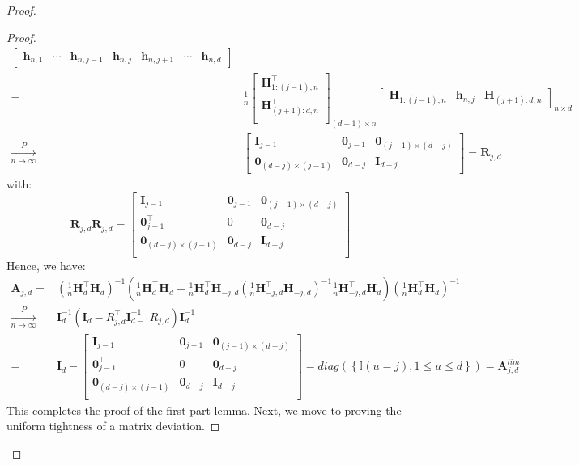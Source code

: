\documentclass[
  12pt]{article}
\newcommand{\pnlim}{\xrightarrow[n \to \infty]{P}}
\newcommand{\bR}{\boldsymbol{R}}
\newcommand{\bh}{\boldsymbol{h}}
\newcommand{\bA}{\boldsymbol{A}}
\newcommand{\bI}{\boldsymbol{I}}
\newcommand{\bH}{\boldsymbol{H}}
\newcommand{\bzero}{\boldsymbol{0}}
\begin{document}
\begin{proof}
\begin{proof}
\begin{equation}
\begin{split}
\begin{bmatrix}
    \bh_{n,1} & \cdots & \bh_{n,j-1}&\bh_{n,j}&\bh_{n,j+1}& \cdots& \bh_{n,d}
\end{bmatrix}\\
= & \frac{1}{n}\begin{bmatrix}
    \bH^\top_{1:(j-1),n}\\
     \bH^\top_{(j+1):d,n}\\
\end{bmatrix}_{(d-1)\times n}\begin{bmatrix}
    \bH_{1:(j-1),n} & \bh_{n,j} & \bH_{(j+1):d,n}
\end{bmatrix}_{n \times d}\\
\pnlim & \begin{bmatrix}
    \bI_{j-1} & \bzero_{j-1} & \bzero_{(j-1) \times (d-j)}\\
    \bzero_{(d-j)\times (j-1)} & \bzero_{d-j} & \bI_{d-j} 
\end{bmatrix} = \bR_{j,d}
        \end{split}
    \end{equation}
with:
\begin{equation}\label{eq:drop-inner-drop}
    \bR_{j,d}^\top\bR_{j,d} = \begin{bmatrix}
    \bI_{j-1} & \bzero_{j-1} & \bzero_{(j-1) \times (d-j)}\\
    \bzero^\top_{j-1} & 0 & \bzero_{d-j}\\
    \bzero_{(d-j) \times (j-1)} & \bzero_{d-j} & \bI_{d-j}\\
\end{bmatrix}
\end{equation}
Hence, we have:
$$
\begin{aligned}
    \bA_{j,d} = & \left(\frac{1}{n}\bH_{d}^\top\bH_{d}\right)^{-1}\left(\frac{1}{n}\bH_{d}^\top\bH_{d} - \frac{1}{n}\bH_{d}^\top\bH_{-j,d}\left(\frac{1}{n}\bH_{-j,d}^\top\bH_{-j,d}\right)^{-1}\frac{1}{n}\bH_{-j,d}^\top\bH_{d}\right)\left(\frac{1}{n}\bH_{d}^\top\bH_{d}\right)^{-1}\\
    \pnlim & \bI^{-1}_d\left(\bI_d - R^\top_{j,d}\bI_{d-1}^{-1}R_{j,d}\right)\bI^{-1}_d\\
    = & \bI_d - \begin{bmatrix}
    \bI_{j-1} & \bzero_{j-1} & \bzero_{(j-1) \times (d-j)}\\
    \bzero^\top_{j-1} & 0 & \bzero_{d-j}\\
    \bzero_{(d-j) \times (j-1)} & \bzero_{d-j} & \bI_{d-j} \\
\end{bmatrix} = diag(\left\{\mathbb{I}(u = j), 1 \leq u \leq d\right\}) = \bA^{lim}_{j,d}
\end{aligned}
$$
This completes the proof of the first part lemma. Next, we move to proving the uniform tightness of a matrix deviation. 


\end{proof}
\end{proof}
\end{document}
